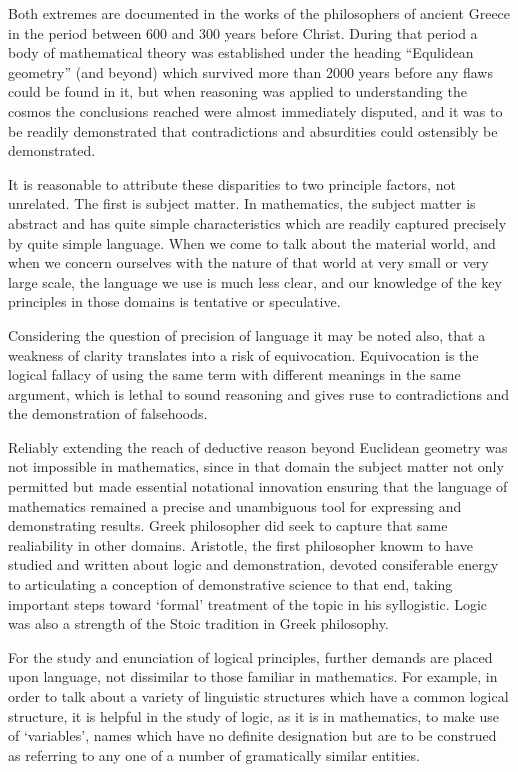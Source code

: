 \documentclass[10pt,titlepage]{article}
\begin{document}
Both extremes are documented in the works of the philosophers of ancient Greece in the period between 600 and 300 years before Christ.
During that period a body of mathematical theory was established under the heading ``Equlidean geometry'' (and beyond) which survived more than 2000 years before any flaws could be found in it, but when reasoning was applied to understanding the cosmos the conclusions reached were almost immediately disputed, and it was to be readily demonstrated that contradictions and absurdities could ostensibly be demonstrated.

It is reasonable to attribute these disparities to two principle factors, not unrelated.
The first is subject matter.
In mathematics, the subject matter is abstract and has quite simple characteristics which are readily captured precisely by quite simple language.
When we come to talk about the material world, and when we concern ourselves with the nature of that world at very small or very large scale, the language we use is much less clear, and our knowledge of the key principles in those domains is tentative or speculative.

Considering the question of precision of language it may be noted also, that a weakness of clarity translates into a risk of equivocation.
Equivocation is the logical fallacy of using the same term with different meanings in the same argument, which is lethal to sound reasoning and gives ruse to contradictions and the demonstration of falsehoods.

Reliably extending the reach of deductive reason beyond Euclidean geometry was not impossible in mathematics, since in that domain the subject matter not only permitted but made essential notational innovation ensuring that the language of mathematics remained a precise and unambiguous tool for expressing and demonstrating results.
Greek philosopher did seek to capture that same realiability in other domains.
Aristotle, the first philosopher knowm to have studied and written about logic and demonstration, devoted consiferable energy to articulating a conception of demonstrative science to that end, taking important steps toward `formal' treatment of the topic in his syllogistic.
Logic was also a strength of the Stoic tradition in Greek philosophy.

For the study and enunciation of logical principles, further demands are placed upon language, not dissimilar to those familiar in mathematics.
For example, in order to talk about a variety of linguistic structures which have a common logical structure, it is helpful in the study of logic, as it is in mathematics, to make use of `variables', names which have no definite designation but are to be construed as referring to any one of a number of gramatically similar entities.
\end{document}
